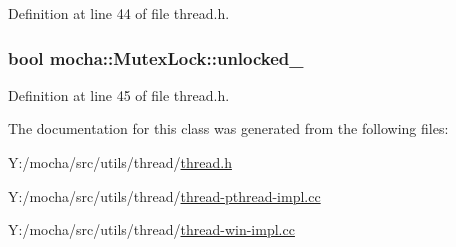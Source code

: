 Definition at line 44 of file thread.h.

\hypertarget{classmocha_1_1_mutex_lock_a87c8af391cdaab7e5a4e0c1fbabd3fe9}{
\subsubsection[{unlocked\_\-}]{\setlength{\rightskip}{0pt plus 5cm}bool {\bf mocha::MutexLock::unlocked\_\-}}}
\label{classmocha_1_1_mutex_lock_a87c8af391cdaab7e5a4e0c1fbabd3fe9}


Definition at line 45 of file thread.h.



The documentation for this class was generated from the following files:\begin{DoxyCompactItemize}
\item 
Y:/mocha/src/utils/thread/\hyperlink{thread_8h}{thread.h}\item 
Y:/mocha/src/utils/thread/\hyperlink{thread-pthread-impl_8cc}{thread-\/pthread-\/impl.cc}\item 
Y:/mocha/src/utils/thread/\hyperlink{thread-win-impl_8cc}{thread-\/win-\/impl.cc}\end{DoxyCompactItemize}
